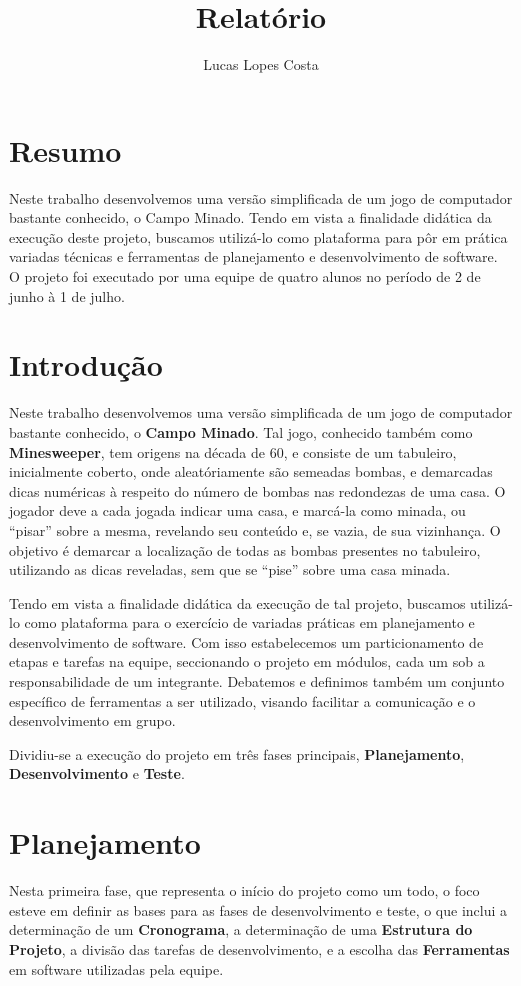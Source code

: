 \documentclass[10pt,a4paper]{report}
\author{Lucas Lopes Costa}
\title{Relatório}
\begin{document}
\chapter{Resumo}

Neste trabalho desenvolvemos uma versão simplificada de um jogo de computador bastante conhecido, o Campo Minado. Tendo em vista a finalidade didática da execução deste projeto, buscamos utilizá-lo como plataforma para pôr em prática variadas técnicas e ferramentas de planejamento e desenvolvimento de software. O projeto foi executado por uma equipe de quatro alunos no período de 2 de junho à 1 de julho.

\chapter{Introdução}

Neste trabalho desenvolvemos uma versão simplificada de um jogo de computador bastante conhecido, o \textbf{Campo Minado}. Tal jogo, conhecido também como \textbf{Minesweeper}, tem origens na década de 60, e consiste de um tabuleiro, inicialmente coberto, onde aleatóriamente são semeadas bombas, e demarcadas dicas numéricas à respeito do número de bombas nas redondezas de uma casa. O jogador deve a cada jogada indicar uma casa, e marcá-la como minada, ou ``pisar'' sobre a mesma, revelando seu conteúdo e, se vazia, de sua vizinhança. O objetivo é demarcar a localização de todas as bombas presentes no tabuleiro, utilizando as dicas reveladas, sem que se ``pise'' sobre uma casa minada.

Tendo em vista a finalidade didática da execução de tal projeto, buscamos utilizá-lo como plataforma para o exercício de variadas práticas em planejamento e desenvolvimento de software. Com isso estabelecemos um particionamento de etapas e tarefas na equipe, seccionando o projeto em módulos, cada um sob a responsabilidade de um integrante. Debatemos e definimos também um conjunto específico de ferramentas a ser utilizado, visando facilitar a comunicação e o desenvolvimento em grupo.

Dividiu-se a execução do projeto em três fases principais, \textbf{Planejamento}, \textbf{Desenvolvimento} e \textbf{Teste}.

\chapter{Planejamento}
Nesta primeira fase, que representa o início do projeto como um todo, o foco esteve em definir as bases para as fases de desenvolvimento e teste, o que inclui a determinação de um \textbf{Cronograma}, a determinação de uma \textbf{Estrutura do Projeto}, a divisão das tarefas de desenvolvimento, e a escolha das \textbf{Ferramentas} em software utilizadas pela equipe.
\end{document}
